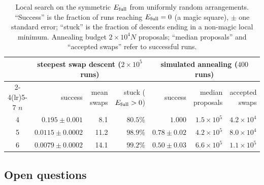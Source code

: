 \begin{table}[htbp]
\centering
\small
\begin{tabular}{c rrr rrr}
\toprule
 & \multicolumn{3}{c}{steepest swap descent ($2\times10^5$ runs)} & \multicolumn{3}{c}{simulated annealing ($400$ runs)}\\
\cmidrule(lr){2-4}\cmidrule(lr){5-7}
$n$ & success & mean swaps & stuck ($E_{\mathrm{full}}>0$) & success & median proposals & accepted swaps \\
\midrule
4 & $0.195\pm0.001$ & 8.1  & $80.5\%$ & $1.000$ & $1.5\times10^5$ & $4.2\times10^4$ \\
5 & $0.0115\pm0.0002$ & 11.2 & $98.9\%$ & $0.78\pm0.02$ & $4.2\times10^5$ & $8.0\times10^4$ \\
6 & $0.0079\pm0.0002$ & 14.1 & $99.2\%$ & $0.50\pm0.03$ & $6.6\times10^5$ & $1.1\times10^5$ \\
\bottomrule
\end{tabular}
\caption{Local search on the symmetric $E_{\mathrm{full}}$ from uniformly random arrangements.
``Success'' is the fraction of runs reaching $E_{\mathrm{full}}=0$ (a magic square), $\pm$ one
standard error; ``stuck'' is the fraction of descents ending in a non-magic local minimum. Annealing
budget $2\times10^4N$ proposals; ``median proposals'' and ``accepted swaps'' refer to successful runs.}
\label{tab:search}
\end{table}

\subsection{Open questions}

